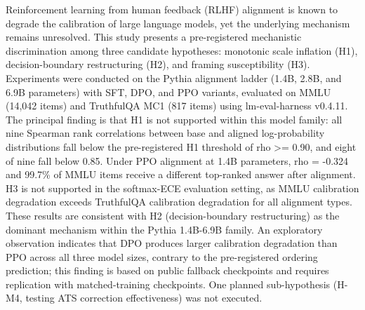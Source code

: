 
Reinforcement learning from human feedback (RLHF) alignment is known to degrade the calibration of large language models, yet the underlying mechanism remains unresolved. This study presents a pre-registered mechanistic discrimination among three candidate hypotheses: monotonic scale inflation (H1), decision-boundary restructuring (H2), and framing susceptibility (H3). Experiments were conducted on the Pythia alignment ladder (1.4B, 2.8B, and 6.9B parameters) with SFT, DPO, and PPO variants, evaluated on MMLU (14,042 items) and TruthfulQA MC1 (817 items) using lm-eval-harness v0.4.11. The principal finding is that H1 is not supported within this model family: all nine Spearman rank correlations between base and aligned log-probability distributions fall below the pre-registered H1 threshold of rho >= 0.90, and eight of nine fall below 0.85. Under PPO alignment at 1.4B parameters, rho = -0.324 and 99.7\% of MMLU items receive a different top-ranked answer after alignment. H3 is not supported in the softmax-ECE evaluation setting, as MMLU calibration degradation exceeds TruthfulQA calibration degradation for all alignment types. These results are consistent with H2 (decision-boundary restructuring) as the dominant mechanism within the Pythia 1.4B-6.9B family. An exploratory observation indicates that DPO produces larger calibration degradation than PPO across all three model sizes, contrary to the pre-registered ordering prediction; this finding is based on public fallback checkpoints and requires replication with matched-training checkpoints. One planned sub-hypothesis (H-M4, testing ATS correction effectiveness) was not executed.
